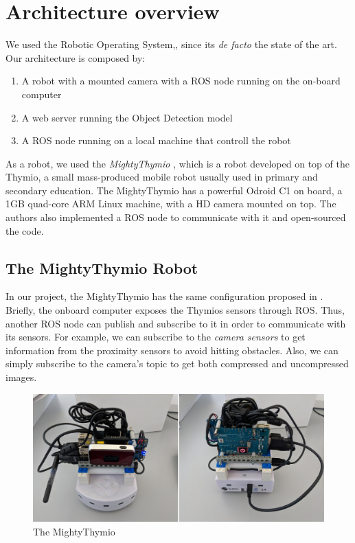 \documentclass[letterpaper, 10 pt, conference]{ieeeconf}  %
\begin{document}
\section{Architecture overview}
We used the Robotic Operating System,\cite{ROS}, since its \emph{de facto} the state of the art. Our architecture is composed by:
\begin{enumerate}
	\item A robot with a mounted camera with a ROS node running on the on-board computer
	\item A web server running the Object Detection model
	\item A ROS node running on a local machine that controll the robot
\end{enumerate}
As a robot, we used the \emph{MightyThymio} \cite{guzzi2018eaai}, which is a robot developed on top of the Thymio, a small mass-produced mobile robot usually used in primary and secondary education. The MightyThymio has a powerful Odroid C1 on board, a 1GB quad-core ARM Linux machine, with a HD camera mounted on top. The authors also implemented a ROS node to communicate with it and open-sourced the code.

\subsection*{The MightyThymio Robot}

In our project, the MightyThymio has the same configuration proposed in \cite{guzzi2018eaai}. Briefly, the onboard computer exposes the Thymios sensors through ROS. Thus, another ROS node can publish and subscribe to it in order to communicate with its sensors. For example, we can subscribe to the \emph{camera sensors} to get information from the proximity sensors to avoid hitting obstacles. Also, we can simply subscribe to the camera's topic to get both compressed and uncompressed images. 
\begin{figure}[H]
\centering
\includegraphics[width=\linewidth]{assembled_myt}	
\caption{The MightyThymio}
\end{figure}
\end{document}
